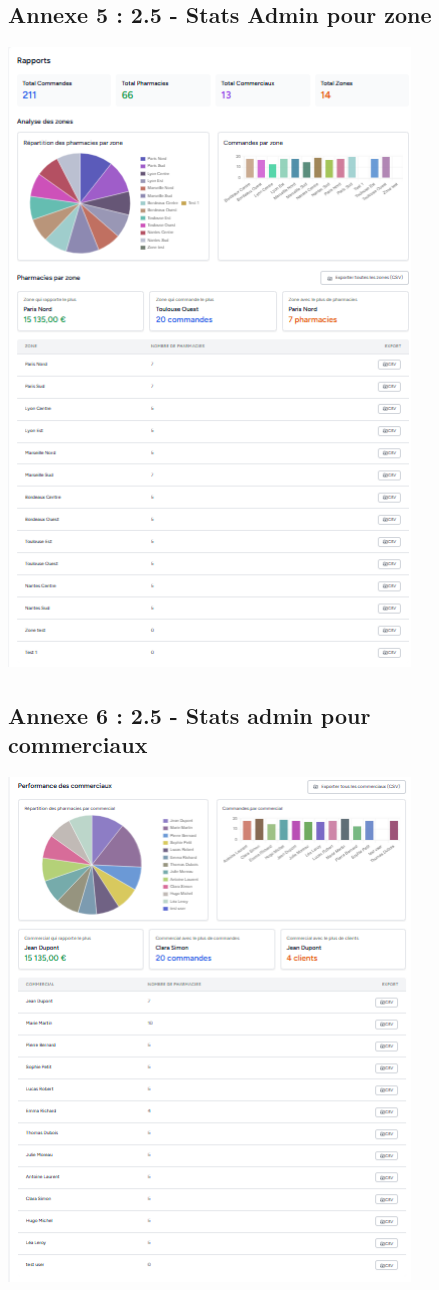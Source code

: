 \documentclass[a4paper,12pt]{report}
\begin{document}
\subsection*{Annexe 5 : 2.5 - Stats Admin pour zone}
\vspace{0.5cm}
\includegraphics[width=0.8\textwidth]{Screens/2.5 - Stats Admin pour zone.png}
\vspace{1cm}

\subsection*{Annexe 6 : 2.5 - Stats admin pour commerciaux}
\vspace{0.5cm}
\includegraphics[width=0.8\textwidth]{Screens/2.5 - Stats admin pour commerciaux.png}
\vspace{1cm}
\end{document}
